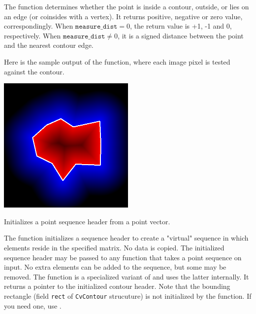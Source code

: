 The function determines whether the
point is inside a contour, outside, or lies on an edge (or coinsides
with a vertex). It returns positive, negative or zero value,
correspondingly. When $\texttt{measure\_dist} =0$, the return value
is +1, -1 and 0, respectively. When $\texttt{measure\_dist} \ne 0$,
it is a signed distance between the point and the nearest contour
edge.

Here is the sample output of the function, where each image pixel is tested against the contour.

\includegraphics[width=0.5\textwidth]{pics/pointpolygon.png}

\ifC

Initializes a point sequence header from a point vector.


\begin{description}
\end{description}

The function initializes a sequence
header to create a "virtual" sequence in which elements reside in
the specified matrix. No data is copied. The initialized sequence
header may be passed to any function that takes a point sequence
on input. No extra elements can be added to the sequence,
but some may be removed. The function is a specialized variant of
 and uses
the latter internally. It returns a pointer to the initialized contour
header. Note that the bounding rectangle (field \texttt{rect} of
\texttt{CvContour} strucuture) is not initialized by the function. If
you need one, use .

